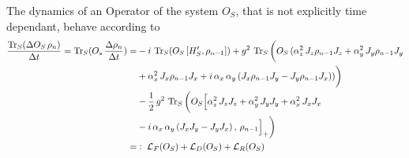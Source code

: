 \documentclass{article}
\begin{document}
The dynamics of an Operator of the system $O_S$, that is not explicitly time dependant, behave according to
\begin{align*}
    \frac{\operatorname{Tr}_S(\Delta O_S\,\rho_n)}{\Delta t} = \operatorname{Tr}_S(O_s\,\frac{\Delta\rho_n}{\Delta t})=&
    -i\,\operatorname{Tr}_S(O_S\,[H_S',\rho_{n-1}])+g^2\,\operatorname{Tr}_S\bigg(O_S\,(\alpha_z^2\,J_z\rho_{n-1}J_z+\alpha_y^2\,J_y\rho_{n-1}J_y\\&+\alpha_x^2\,J_x\rho_{n-1}J_x+i\,\alpha_x\,\alpha_y\,(J_x\rho_{n-1}J_y-J_y\rho_{n-1}J_x))\bigg)\\
    &-\frac{1}{2}\,g^2\,\operatorname{Tr}_S\bigg(O_S\Big[\alpha_z^2\,J_zJ_z+\alpha_y^2\,J_yJ_y+\alpha_x^2\,J_xJ_x\\
    &-i\,\alpha_x\,\alpha_y\,(J_xJ_y-J_yJ_x)\,,\,\rho_{n-1}\Big]_+\bigg)\\
    =&\vcentcolon\;\mathcal{L}_F(O_S)+\mathcal{L}_D(O_S)+\mathcal{L}_{R}(O_S)
\end{align*}
\end{document}
